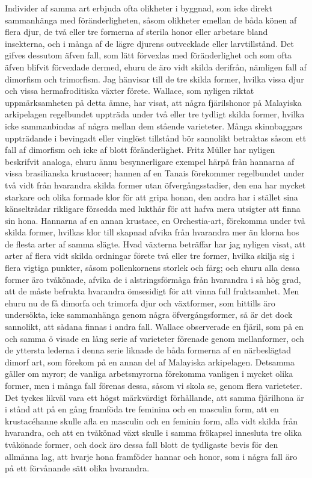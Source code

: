 Individer af samma art erbjuda ofta olikheter i byggnad, som icke direkt sammanhänga med föränderligheten, såsom olikheter emellan de båda könen af flera djur, de två eller tre formerna af sterila honor eller arbetare bland insekterna, och i många af de lägre djurens outvecklade eller larvtillstånd. Det gifves dessutom äfven fall, som lätt förvexlas med föränderlighet och som ofta äfven blifvit förvexlade dermed, ehuru de äro vidt skilda derifrån, nämligen fall af dimorfism och trimorfism. Jag hänvisar till de tre skilda former, hvilka vissa djur och vissa hermafroditiska växter förete. Wallace, som nyligen riktat uppmärksamheten på detta ämne, har visat, att några fjärilshonor på Malayiska arkipelagen regelbundet uppträda under två eller tre tydligt skilda former, hvilka icke sammanbindas af några mellan dem stående varieteter. Många skinnbaggars uppträdande i bevingadt eller vinglöst tillstånd bör sannolikt betraktas såsom ett fall af dimorfism och icke af blott föränderlighet. Fritz Müller har nyligen beskrifvit analoga, ehuru ännu besynnerligare exempel härpå från hannarna af vissa brasilianska krustaceer; hannen af en Tanais förekommer regelbundet under två vidt från hvarandra skilda former utan öfvergångsstadier, den ena har mycket starkare och olika formade klor för att gripa honan, den andra har i stället sina känseltrådar rikligare försedda med lukthår för att hafva mera utsigter att finna sin hona. Hannarna af en annan krustace, en Orchestia-art, förekomma under två skilda former, hvilkas klor till skapnad afvika från hvarandra mer än klorna hos de flesta arter af samma slägte. Hvad växterna beträffar har jag nyligen visat, att arter af flera vidt skilda ordningar förete två eller tre former, hvilka skilja sig i flera vigtiga punkter, såsom pollenkornens storlek och färg; och ehuru alla dessa former äro tvåkönade, afvika de i alstringsförmåga från hvarandra i så hög grad, att de måste befrukta hvarandra ömsesidigt för att vinna full fruktsamhet. Men ehuru nu de få dimorfa och trimorfa djur och växtformer, som hittills äro undersökta, icke sammanhänga genom några öfvergångsformer, så är det dock sannolikt, att sådana finnas i andra fall. Wallace observerade en fjäril, som på en och samma ö visade en lång serie af varieteter förenade genom mellanformer, och de yttersta lederna i denna serie liknade de båda formerna af en närbeslägtad dimorf art, som förekom på en annan del af Malayiska arkipelagen. Detsamma gäller om myror; de vanliga arbetsmyrorna förekomma vanligen i mycket olika former, men i många fall förenas dessa, såsom vi skola se, genom flera varieteter. Det tyckes likväl vara ett högst märkvärdigt förhållande, att samma fjärilhona är i stånd att på en gång framföda tre feminina och en masculin form, att en krustacéhanne skulle afla en masculin och en feminin form, alla vidt skilda från hvarandra, och att en tvåkönad växt skulle i samma frökapsel innesluta tre olika tvåkönade former, och dock äro dessa fall blott de tydligaste bevis för den allmänna lag, att hvarje hona framföder hannar och honor, som i några fall äro på ett förvånande sätt olika hvarandra.



